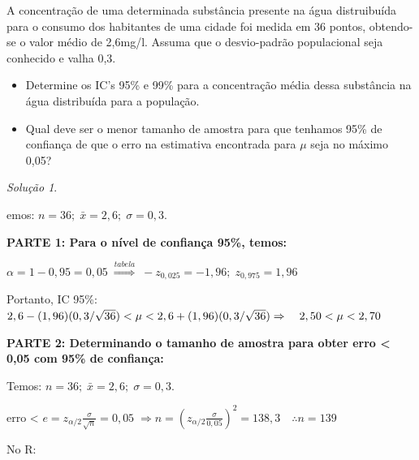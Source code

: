 \documentclass[
]{book}
\theoremstyle{definition}
\theoremstyle{definition}
\theoremstyle{definition}
\theoremstyle{remark}
\newtheorem*{solution}{Solução}
\begin{document}
A concentração de uma determinada substância presente na água distruibuída para o consumo dos habitantes de uma cidade foi medida em 36 pontos, obtendo-se o valor médio de 2,6mg/l. Assuma que o desvio-padrão populacional seja conhecido e valha 0,3.

\begin{itemize}
\item
  Determine os IC's 95\% e 99\% para a concentração média dessa substância na água distribuída para a população.
\item
  Qual deve ser o menor tamanho de amostra para que tenhamos 95\% de confiança de que o erro na estimativa encontrada para \(\mu\) seja no máximo 0,05?
\end{itemize}

\begin{solution}
{}
\end{solution}

emos: \(n = 36; \; \bar{x} = 2,6; \; \sigma = 0,3\).

\textbf{PARTE 1: Para o nível de confiança 95\%, temos:}

\(\alpha = 1- 0,95 = 0,05 \; \overset{tabela}{\Rightarrow} \; -z_{0,025} = -1,96; \; z_{0,975} = 1,96\)

Portanto,
IC 95\%: \(2,6 - (1,96) (0,3/\sqrt{36}) < \mu < 2,6 + (1,96) (0,3/\sqrt{36})\\ \Rightarrow \quad 2,50 < \mu < 2,70\)

\textbf{PARTE 2: Determinando o tamanho de amostra para obter erro \textless{} 0,05 com 95\% de confiança:}

Temos: \(n = 36; \; \bar{x} = 2,6; \; \sigma = 0,3\).

erro \textless{} \(e = z_{\alpha/2}\frac{\sigma}{\sqrt{n}} = 0,05 \; \Rightarrow n = \left(z_{\alpha/2}\frac{\sigma}{0,05}\right)^2 =138,3 \quad \therefore n = 139\)

No R:
\end{document}

